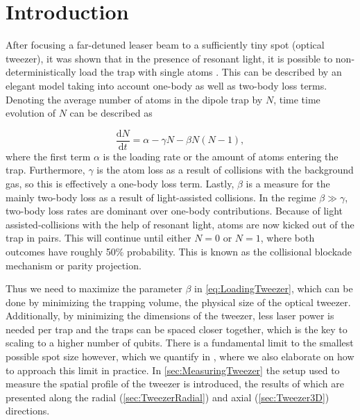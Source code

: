 \section{Introduction}\label{sec:LoadingAtoms}

After focusing a far-detuned leaser beam to a sufficiently tiny spot (optical tweezer), it was shown that in the presence of resonant light, it is possible to non-deterministically load the trap with single atoms \cite{Schlosser2001}.
This can be described by an elegant model taking into account one-body as well as two-body loss terms. 
Denoting the average number of atoms in the dipole trap by $N$, time time evolution of $N$ can be described as \cite{Schlosser2002} 

\begin{equation}\label{eq:LoadingTweezer}
	\frac{\text{d}N}{\text{d}t} = \alpha - \gamma N - \beta N(N-1),
\end{equation}
where the first term $\alpha$ is the loading rate or the amount of atoms entering the trap.
Furthermore, $\gamma$ is the atom loss as a result of collisions with the background gas, so this is effectively a one-body loss term.
Lastly, $\beta$ is a measure for the mainly two-body loss as a result of light-assisted collisions.
In the regime $\beta \gg \gamma$, two-body loss rates are dominant over one-body contributions. 
Because of light assisted-collisions with the help of resonant light, atoms are now kicked out of the trap in pairs.
This will continue until either $N=0$ or $N=1$, where both outcomes have roughly 50\% probability.
This is known as the collisional blockade mechanism \cite{Schlosser2001} or parity projection.



Thus we need to maximize the parameter $\beta$ in \cref{eq:LoadingTweezer}, which can be done by minimizing the trapping volume, the physical size of the optical tweezer.
Additionally, by minimizing the dimensions of the tweezer, less laser power is needed per trap and the traps can be spaced closer together, which is the key to scaling to a higher number of qubits.
There is a fundamental limit to the smallest possible spot size however, which we quantify in , where we also elaborate on how to approach this limit in practice.
In \cref{sec:MeasuringTweezer} the setup used to measure the spatial profile of the tweezer is introduced, the results of which are presented along the radial (\cref{sec:TweezerRadial}) and axial (\cref{sec:Tweezer3D}) directions.

